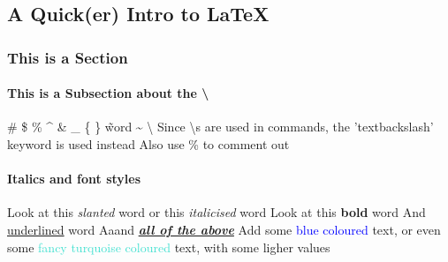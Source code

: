 \documentclass[12pt,twoside,a4paper]{article}
\begin{document}
\begin{center}
  \part*{A Quick(er) Intro to \LaTeX}
\end{center}

\section*{This is a Section}

\subsection*{This is a Subsection about the \textbackslash}

\# \$ \% \^{} \& \_ \{ \} \~word \~{} \textbackslash
\newline \newline Since \textbackslash s are used in commands, the 'textbackslash' keyword is used instead
\newline Also use \% to comment out %

\subsection*{Italics and font styles}
Look at this \textsl{slanted} word
\newline or this \textit{italicised} word %
\newline Look at this \textbf{bold} word \newline And \underline{underlined} word
\newline Aaand \textbf{\textit{\underline{all of the above}}}
\newline \newline Add some \textcolor{blue}{blue coloured} text, or even some
\textcolor{Turquoise}{fancy turquoise coloured} text, with some
\textcolor{TurquoiseLighter2}{ligher values}
\newpage
\end{document}
